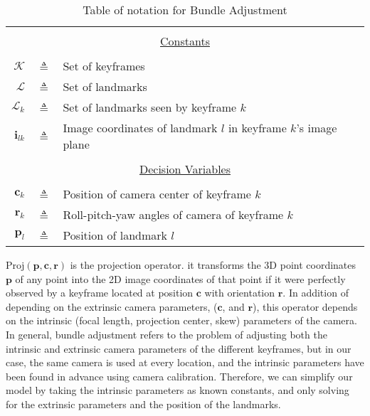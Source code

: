 \begin{table}[H] \caption{Table of notation for Bundle Adjustment}
  \centering
  \begin{tabular}{r c p{10cm} }
  \toprule
  \multicolumn{3}{c}{}\\
  \multicolumn{3}{c}{\underline{Constants}}\\
  \multicolumn{3}{c}{}\\
  $\mathcal{K}$   & $\triangleq$ & Set of keyframes\\
  $\mathcal{L}$   & $\triangleq$ & Set of landmarks\\
  $\mathcal{L}_k$ & $\triangleq$ & Set of landmarks seen by keyframe $k$\\
  $\mathbf{i}_{lk}$        & $\triangleq$ & Image coordinates of landmark $l$ in keyframe $k$'s image plane\\
  \multicolumn{3}{c}{}\\
  \multicolumn{3}{c}{\underline{Decision Variables}}\\
  \multicolumn{3}{c}{}\\
  $\mathbf{c}_k$           & $\triangleq$ & Position of camera center of keyframe $k$\\
  $\mathbf{r}_k$           & $\triangleq$ & Roll-pitch-yaw angles of camera of keyframe $k$\\
  $\mathbf{p}_l$           & $\triangleq$ & Position of landmark $l$\\
  \bottomrule
  \end{tabular}
  \label{tab:banotation}
\end{table}

$\mathrm{Proj}(\mathbf{p},\mathbf{c},\mathbf{r})$ is the projection operator. it transforms the 3D point coordinates $\mathbf{p}$ of any point into the 2D image coordinates of that point if it were perfectly observed by a keyframe located at position $\mathbf{c}$ with orientation $\mathbf{r}$. In addition of depending on the extrinsic camera parameters, ($\mathbf{c}$, and $\mathbf{r}$), this operator depends on the intrinsic (focal length, projection center, skew) parameters of the camera. In general, bundle adjustment refers to the problem of adjusting both the intrinsic and extrinsic camera parameters of the different keyframes, but in our case, the same camera is used at every location, and the intrinsic parameters have been found in advance using camera calibration. Therefore, we can simplify our model by taking the intrinsic parameters as known constants, and only solving for the extrinsic parameters and the position of the landmarks.

